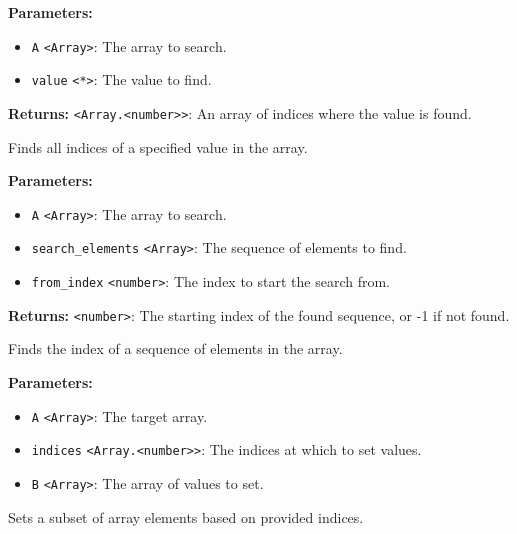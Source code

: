 \documentclass[12pt,a4paper]{article}
\begin{document}
\noindent \textbf{Parameters:}
\begin{itemize}
  \item \texttt{A} \texttt{<Array>}: The array to search.
  \item \texttt{value} \texttt{<*>}: The value to find.
\end{itemize}

\noindent \textbf{Returns:} \texttt{<Array.<number>>}: An array of indices where the value is found.

\noindent Finds all indices of a specified value in the array.

\vspace{5mm}
\noindent {}


\noindent \textbf{Parameters:}
\begin{itemize}
  \item \texttt{A} \texttt{<Array>}: The array to search.
  \item \texttt{search\_elements} \texttt{<Array>}: The sequence of elements to find.
  \item \texttt{from\_index} \texttt{<number>}: The index to start the search from.
\end{itemize}

\noindent \textbf{Returns:} \texttt{<number>}: The starting index of the found sequence, or -1 if not found.

\noindent Finds the index of a sequence of elements in the array.

\vspace{5mm}
\noindent {}


\noindent \textbf{Parameters:}
\begin{itemize}
  \item \texttt{A} \texttt{<Array>}: The target array.
  \item \texttt{indices} \texttt{<Array.<number>>}: The indices at which to set values.
  \item \texttt{B} \texttt{<Array>}: The array of values to set.
\end{itemize}

\noindent Sets a subset of array elements based on provided indices.

\vspace{5mm}
\noindent {}
\end{document}
